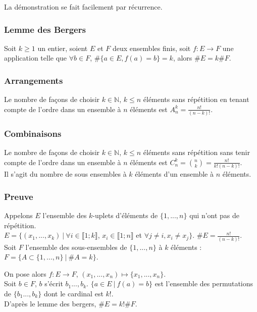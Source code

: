 \documentclass[a4paper,10pt]{book} %
\newcommand{\N}{\mathbb{N}}
\newcommand{\tq}{~|~}
\begin{document}
La démonstration se fait facilement par récurrence.

\subsubsection{Lemme des Bergers}
Soit $k\geq 1$ un entier, soient $E$ et $F$ deux ensembles finis, soit $f : E\rightarrow F$ une application telle que $\forall b\in F$, $\#\{a\in E, f(a)=b\}=k$, alors $\#E=k\#F$.

\subsubsection{Arrangements}
Le nombre de façons de choisir $k\in \N$, $k\leq n$ éléments sans répétition en tenant compte de l'ordre dans un ensemble à $n$ éléments est $A^k_n=\frac{n!}{(n-k)!}$.

\subsubsection{Combinaisons}
Le nombre de façons de choisir $k\in \N$, $k\leq n$ éléments sans répétition sans tenir compte de l'ordre dans un ensemble à $n$ éléments est $C^k_n=\binom{n}{k}=\frac{n!}{k!(n-k)!}$.\\

Il s'agit du nombre de sous ensembles à $k$ éléments d'un ensemble à $n$ éléments.

\subsubsection{Preuve}
Appelons $E$ l'ensemble des $k$-uplets d'éléments de $\{1,...,n\}$ qui n'ont pas de répétition.\\

$E=\{(x_1,...,x_k)\tq \forall i\in \llbracket 1;k\rrbracket$, $x_i\in \llbracket 1;n\rrbracket$ et $\forall j\neq i, x_i\neq x_j\}$. $\#E=\frac{n!}{(n-k)!}$.\\

Soit $F$ l'ensemble des sous-ensembles de $\{1,...,n\}$ à $k$ éléments : $F=\{A\subset \{1,...,n\}\tq \#A=k\}$.

On pose alors $f:E\rightarrow F$, $(x_1,...,x_n)\mapsto \{x_1,...,x_n\}$.\\
Soit $b\in F$, $b$ s'écrit ${b_1...,b_k}$. $\{a\in E\tq f(a)=b\}$ est l'ensemble des permutations de $\{b_1...,b_k\}$ dont le cardinal est $k!$.\\

D'après le lemme des bergers, $\#E=k!\#F$.
\end{document}

